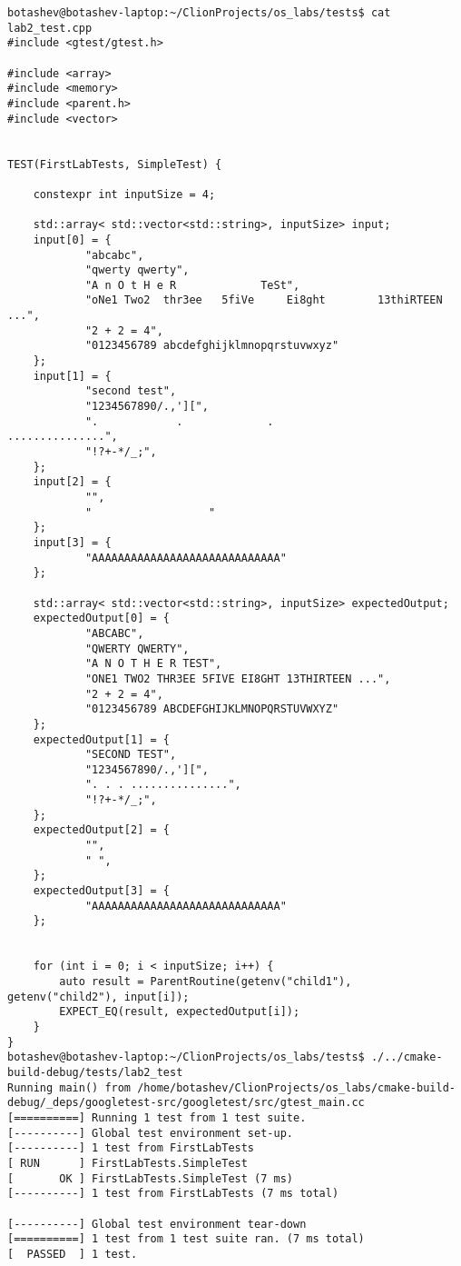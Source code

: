 \documentclass[pdf, unicode, 12pt, a4paper,oneside,fleqn]{article}
\begin{document}
\begin{verbatim}
botashev@botashev-laptop:~/ClionProjects/os_labs/tests$ cat lab2_test.cpp 
#include <gtest/gtest.h>

#include <array>
#include <memory>
#include <parent.h>
#include <vector>


TEST(FirstLabTests, SimpleTest) {

    constexpr int inputSize = 4;

    std::array< std::vector<std::string>, inputSize> input;
    input[0] = {
            "abcabc",
            "qwerty qwerty",
            "A n O t H e R             TeSt",
            "oNe1 Two2  thr3ee   5fiVe     Ei8ght        13thiRTEEN             ...",
            "2 + 2 = 4",
            "0123456789 abcdefghijklmnopqrstuvwxyz"
    };
    input[1] = {
            "second test",
            "1234567890/.,'][",
            ".            .             .                         ...............",
            "!?+-*/_;",
    };
    input[2] = {
            "",
            "                  "
    };
    input[3] = {
            "AAAAAAAAAAAAAAAAAAAAAAAAAAAAA"
    };

    std::array< std::vector<std::string>, inputSize> expectedOutput;
    expectedOutput[0] = {
            "ABCABC",
            "QWERTY QWERTY",
            "A N O T H E R TEST",
            "ONE1 TWO2 THR3EE 5FIVE EI8GHT 13THIRTEEN ...",
            "2 + 2 = 4",
            "0123456789 ABCDEFGHIJKLMNOPQRSTUVWXYZ"
    };
    expectedOutput[1] = {
            "SECOND TEST",
            "1234567890/.,'][",
            ". . . ...............",
            "!?+-*/_;",
    };
    expectedOutput[2] = {
            "",
            " ",
    };
    expectedOutput[3] = {
            "AAAAAAAAAAAAAAAAAAAAAAAAAAAAA"
    };


    for (int i = 0; i < inputSize; i++) {
        auto result = ParentRoutine(getenv("child1"), getenv("child2"), input[i]);
        EXPECT_EQ(result, expectedOutput[i]);
    }
}
botashev@botashev-laptop:~/ClionProjects/os_labs/tests$ ./../cmake-build-debug/tests/lab2_test 
Running main() from /home/botashev/ClionProjects/os_labs/cmake-build-debug/_deps/googletest-src/googletest/src/gtest_main.cc
[==========] Running 1 test from 1 test suite.
[----------] Global test environment set-up.
[----------] 1 test from FirstLabTests
[ RUN      ] FirstLabTests.SimpleTest
[       OK ] FirstLabTests.SimpleTest (7 ms)
[----------] 1 test from FirstLabTests (7 ms total)

[----------] Global test environment tear-down
[==========] 1 test from 1 test suite ran. (7 ms total)
[  PASSED  ] 1 test.
\end{verbatim}
\end{document}

